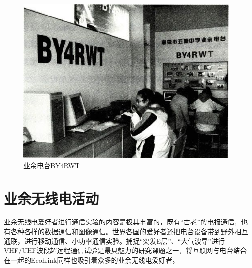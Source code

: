 \documentclass[12pt,UTF8]{ctexbook}
\begin{document}
\begin{figure}[htbp]
	\centering
	\includegraphics[width=0.7\linewidth]{2}
	\caption{业余电台BY4RWT}
	\label{fig:1}
\end{figure}

\section{业余无线电活动}

业余无线电爱好者进行通信实验的内容是极其丰富的，既有“古老”的电报通信，也有各种各样的数据通信和图像通信。世界各国的爱好者还把电台设备带到野外相互通联，进行移动通信、小功率通信实验。捕捉“突发E层”、“大气波导”进行VHF/UHF波段超远程通信试验是最具魅力的研究课题之一，将互联网与电台结合在一起的Ecohlink同样也吸引着众多的业余无线电爱好者。
\end{document}
